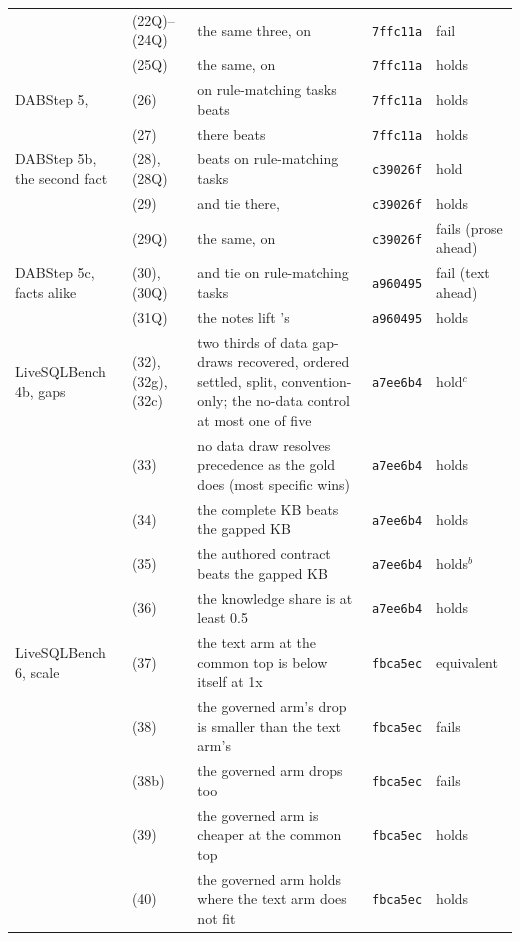 \begin{table}[t]
\begin{tabular}{@{}L{2.7cm}L{1.5cm}L{9.0cm}ll@{}}
 & (22Q)--(24Q) & the same three, on \mQwen{} & \texttt{7ffc11a} & fail \\
 & (25Q) & the same, on \mQwen{} & \texttt{7ffc11a} & holds \\
DABStep 5, \mQwen{} & (26) & on rule-matching tasks \armT{} beats \armMw{} & \texttt{7ffc11a} & holds \\
 & (27) & there \armC{} beats \armT{} & \texttt{7ffc11a} & holds \\
\midrule
DABStep 5b, the second fact & (28), (28Q) & \armMws{} beats \armMw{} on rule-matching tasks & \texttt{c39026f} & hold \\
 & (29) & \armT{} and \armMws{} tie there, \mLuna{} & \texttt{c39026f} & holds \\
 & (29Q) & the same, on \mQwen{} & \texttt{c39026f} & fails (prose ahead) \\
DABStep 5c, facts alike & (30), (30Q) & \armTws{} and \armMws{} tie on rule-matching tasks & \texttt{a960495} & fail (text ahead) \\
 & (31Q) & the notes lift \mQwen{}'s \armT{} & \texttt{a960495} & holds \\
\midrule
LiveSQLBench 4b, gaps & (32), (32g), (32c) & two thirds of data gap-draws recovered, ordered settled, split, convention-only; the no-data control at most one of five & \texttt{a7ee6b4} & hold$^c$ \\
 & (33) & no data draw resolves precedence as the gold does (most specific wins) & \texttt{a7ee6b4} & holds \\
 & (34) & the complete KB beats the gapped KB & \texttt{a7ee6b4} & holds \\
 & (35) & the authored contract beats the gapped KB & \texttt{a7ee6b4} & holds$^b$ \\
 & (36) & the knowledge share is at least 0.5 & \texttt{a7ee6b4} & holds \\
\midrule
LiveSQLBench 6, scale & (37) & the text arm at the common top is below itself at 1x & \texttt{fbca5ec} & equivalent \\
 & (38) & the governed arm's drop is smaller than the text arm's & \texttt{fbca5ec} & fails \\
 & (38b) & the governed arm drops too & \texttt{fbca5ec} & fails \\
 & (39) & the governed arm is cheaper at the common top & \texttt{fbca5ec} & holds \\
 & (40) & the governed arm holds where the text arm does not fit & \texttt{fbca5ec} & holds \\
\midrule

\end{tabular}
\end{table}
